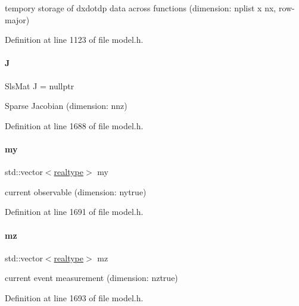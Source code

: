 tempory storage of dxdotdp data across functions (dimension\+: nplist x nx, row-\/major) 

Definition at line 1123 of file model.\+h.

\mbox{\label{classamici_1_1_model_a71cc1d93543998249a172328e1a4dbcd}} 
\paragraph{\texorpdfstring{J}{J}}
{\footnotesize\ttfamily Sls\+Mat J = nullptr\hspace{0.3cm}{\ttfamily [protected]}}

Sparse Jacobian (dimension\+: nnz) 

Definition at line 1688 of file model.\+h.

\mbox{\label{classamici_1_1_model_ab9db87a0acf848c904c792edab3b5828}} 
\paragraph{\texorpdfstring{my}{my}}
{\footnotesize\ttfamily std\+::vector$<$\mbox{\hyperlink{namespaceamici_a1bdce28051d6a53868f7ccbf5f2c14a3}{realtype}}$>$ my\hspace{0.3cm}{\ttfamily [protected]}}

current observable (dimension\+: nytrue) 

Definition at line 1691 of file model.\+h.

\mbox{\label{classamici_1_1_model_afff14791b6839ad61750cc360e44e890}} 
\paragraph{\texorpdfstring{mz}{mz}}
{\footnotesize\ttfamily std\+::vector$<$\mbox{\hyperlink{namespaceamici_a1bdce28051d6a53868f7ccbf5f2c14a3}{realtype}}$>$ mz\hspace{0.3cm}{\ttfamily [protected]}}

current event measurement (dimension\+: nztrue) 

Definition at line 1693 of file model.\+h.


